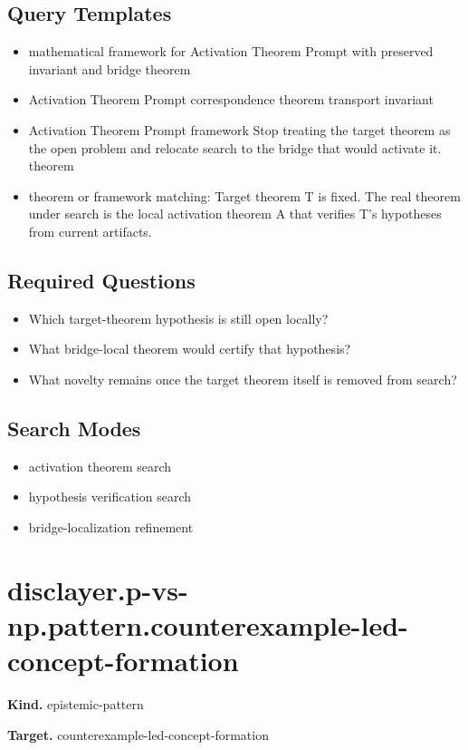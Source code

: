\documentclass[11pt]{article}
\begin{document}
\subsection*{Query Templates}
\begin{itemize}[leftmargin=*,itemsep=0.2em]
\item mathematical framework for Activation Theorem Prompt with preserved invariant and bridge theorem
\item Activation Theorem Prompt correspondence theorem transport invariant
\item Activation Theorem Prompt framework Stop treating the target theorem as the open problem and relocate search to the bridge that would activate it. theorem
\item theorem or framework matching: Target theorem T is fixed. The real theorem under search is the local activation theorem A that verifies T's hypotheses from current artifacts.
\end{itemize}
\subsection*{Required Questions}
\begin{itemize}[leftmargin=*,itemsep=0.2em]
\item Which target-theorem hypothesis is still open locally?
\item What bridge-local theorem would certify that hypothesis?
\item What novelty remains once the target theorem itself is removed from search?
\end{itemize}
\subsection*{Search Modes}
\begin{itemize}[leftmargin=*,itemsep=0.2em]
\item activation theorem search
\item hypothesis verification search
\item bridge-localization refinement
\end{itemize}
\section{disclayer.p-vs-np.pattern.counterexample-led-concept-formation}
\textbf{Kind.} epistemic-pattern

\textbf{Target.} counterexample-led-concept-formation
\end{document}
